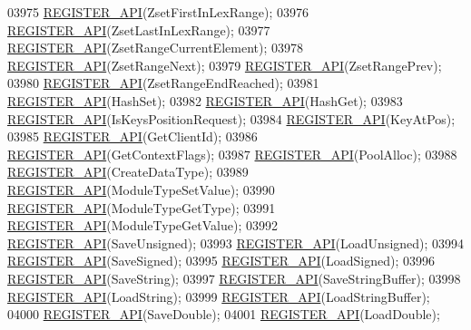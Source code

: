 \begin{DoxyCode}
{{{{{{{{{{{{{{{{{{{03975     \hyperlink{module_8c_a38783dad7766982759c7d417a8ab9211}{REGISTER\_API}(ZsetFirstInLexRange);
03976     \hyperlink{module_8c_a38783dad7766982759c7d417a8ab9211}{REGISTER\_API}(ZsetLastInLexRange);
03977     \hyperlink{module_8c_a38783dad7766982759c7d417a8ab9211}{REGISTER\_API}(ZsetRangeCurrentElement);
03978     \hyperlink{module_8c_a38783dad7766982759c7d417a8ab9211}{REGISTER\_API}(ZsetRangeNext);
03979     \hyperlink{module_8c_a38783dad7766982759c7d417a8ab9211}{REGISTER\_API}(ZsetRangePrev);
03980     \hyperlink{module_8c_a38783dad7766982759c7d417a8ab9211}{REGISTER\_API}(ZsetRangeEndReached);
03981     \hyperlink{module_8c_a38783dad7766982759c7d417a8ab9211}{REGISTER\_API}(HashSet);
03982     \hyperlink{module_8c_a38783dad7766982759c7d417a8ab9211}{REGISTER\_API}(HashGet);
03983     \hyperlink{module_8c_a38783dad7766982759c7d417a8ab9211}{REGISTER\_API}(IsKeysPositionRequest);
03984     \hyperlink{module_8c_a38783dad7766982759c7d417a8ab9211}{REGISTER\_API}(KeyAtPos);
03985     \hyperlink{module_8c_a38783dad7766982759c7d417a8ab9211}{REGISTER\_API}(GetClientId);
03986     \hyperlink{module_8c_a38783dad7766982759c7d417a8ab9211}{REGISTER\_API}(GetContextFlags);
03987     \hyperlink{module_8c_a38783dad7766982759c7d417a8ab9211}{REGISTER\_API}(PoolAlloc);
03988     \hyperlink{module_8c_a38783dad7766982759c7d417a8ab9211}{REGISTER\_API}(CreateDataType);
03989     \hyperlink{module_8c_a38783dad7766982759c7d417a8ab9211}{REGISTER\_API}(ModuleTypeSetValue);
03990     \hyperlink{module_8c_a38783dad7766982759c7d417a8ab9211}{REGISTER\_API}(ModuleTypeGetType);
03991     \hyperlink{module_8c_a38783dad7766982759c7d417a8ab9211}{REGISTER\_API}(ModuleTypeGetValue);
03992     \hyperlink{module_8c_a38783dad7766982759c7d417a8ab9211}{REGISTER\_API}(SaveUnsigned);
03993     \hyperlink{module_8c_a38783dad7766982759c7d417a8ab9211}{REGISTER\_API}(LoadUnsigned);
03994     \hyperlink{module_8c_a38783dad7766982759c7d417a8ab9211}{REGISTER\_API}(SaveSigned);
03995     \hyperlink{module_8c_a38783dad7766982759c7d417a8ab9211}{REGISTER\_API}(LoadSigned);
03996     \hyperlink{module_8c_a38783dad7766982759c7d417a8ab9211}{REGISTER\_API}(SaveString);
03997     \hyperlink{module_8c_a38783dad7766982759c7d417a8ab9211}{REGISTER\_API}(SaveStringBuffer);
03998     \hyperlink{module_8c_a38783dad7766982759c7d417a8ab9211}{REGISTER\_API}(LoadString);
03999     \hyperlink{module_8c_a38783dad7766982759c7d417a8ab9211}{REGISTER\_API}(LoadStringBuffer);
04000     \hyperlink{module_8c_a38783dad7766982759c7d417a8ab9211}{REGISTER\_API}(SaveDouble);
04001     \hyperlink{module_8c_a38783dad7766982759c7d417a8ab9211}{REGISTER\_API}(LoadDouble);
}}}}}}}}}}}}}}}}}}}
\end{DoxyCode}

